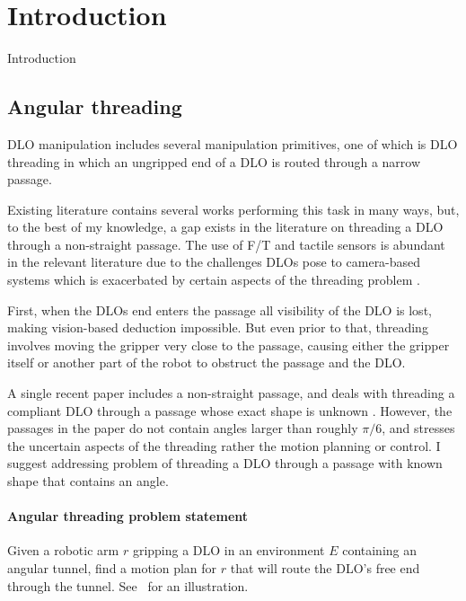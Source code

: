 \section{Introduction}
\label{sec:intro}

Introduction

\subsection{Angular threading}

DLO manipulation includes several manipulation primitives, one of which is DLO threading in which an ungripped end of a DLO is routed through a narrow passage. 

Existing literature contains several works performing this task in many ways, but, to the best of my knowledge, a gap exists in the literature on threading a DLO through a non-straight passage. The use of F/T and tactile sensors is abundant in the relevant literature due to the challenges DLOs pose to camera-based systems which is exacerbated by certain aspects of the threading problem \cite{kr-aecsagphi-22,nkot-sditfw-97,slk-ftmdloeffi-22,wjly-cratmp-22,zdpp-dhattfmn-19,lvw-crcrisb-24}.  

First, when the DLOs end enters the passage all visibility of the DLO is lost, making vision-based deduction impossible. But even prior to that, threading involves moving the gripper very close to the passage, causing either the gripper itself or another part of the robot to obstruct the passage and the DLO.

A single recent paper includes a non-straight passage, and deals with threading a compliant DLO through a passage whose exact shape is unknown \cite{lvw-crcrisb-24}. However, the passages in the paper do not contain angles larger than roughly $\pi/6$, and stresses the uncertain aspects of the threading rather the motion planning or control. I suggest addressing problem of threading a DLO through a passage with known shape that contains an angle.

\paragraph{\textbf{Angular threading problem statement}} Given a robotic arm $r$ gripping a DLO in an environment $E$ containing an angular tunnel, find a motion plan for $r$ that will route the DLO's free end through the tunnel. See~ for an illustration.

